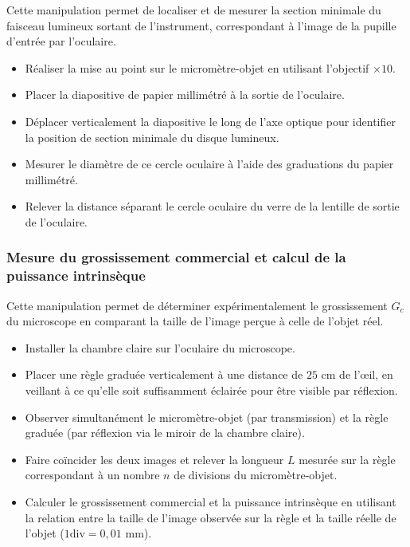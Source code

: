 Cette manipulation permet de localiser et de mesurer la section minimale du faisceau lumineux sortant de l'instrument, correspondant à l'image de la pupille d'entrée par l'oculaire.

\begin{itemize}
    \item Réaliser la mise au point sur le micromètre-objet en utilisant l'objectif $\times 10$.
    \item Placer la diapositive de papier millimétré à la sortie de l'oculaire.
    \item Déplacer verticalement la diapositive le long de l'axe optique pour identifier la position de section minimale du disque lumineux.
    \item Mesurer le diamètre de ce cercle oculaire à l'aide des graduations du papier millimétré.
    \item Relever la distance séparant le cercle oculaire du verre de la lentille de sortie de l'oculaire.
\end{itemize}

\subsubsection{Mesure du grossissement commercial et calcul de la puissance intrinsèque}

Cette manipulation permet de déterminer expérimentalement le grossissement $G_c$ du microscope en comparant la taille de l'image perçue à celle de l'objet réel.

\begin{itemize}
    \item Installer la chambre claire sur l'oculaire du microscope.
    \item Placer une règle graduée verticalement à une distance de $25$ cm de l'œil, en veillant à ce qu'elle soit suffisamment éclairée pour être visible par réflexion.
    \item Observer simultanément le micromètre-objet (par transmission) et la règle graduée (par réflexion via le miroir de la chambre claire).
    \item Faire coïncider les deux images et relever la longueur $L$ mesurée sur la règle correspondant à un nombre $n$ de divisions du micromètre-objet.
    \item Calculer le grossissement commercial et la puissance intrinsèque en utilisant la relation entre la taille de l'image observée 
    sur la règle et la taille réelle de l'objet ($1 \mathrm{ div} = 0,01$ mm).
\end{itemize}

